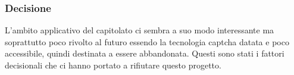 \subsubsection{Decisione}
L'ambito applicativo del capitolato ci sembra a suo modo interessante ma soprattutto poco rivolto al futuro essendo la tecnologia captcha datata e poco accessibile, quindi destinata a essere abbandonata. Questi sono stati i fattori decisionali che ci hanno portato a rifiutare questo progetto.
